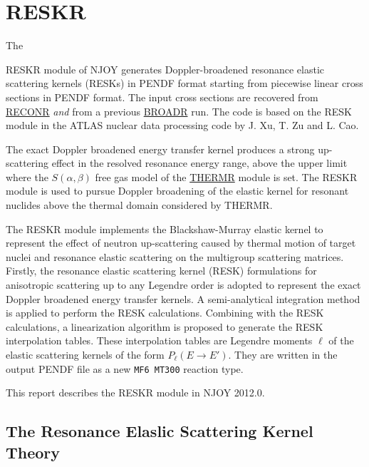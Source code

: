 \section{RESKR}
\label{sRESKR}

\hypertarget{sRESKRhy}{The}
RESKR module of NJOY generates
Doppler-broadened resonance elastic scattering
kernels (RESKs) in PENDF format starting from piecewise linear
cross sections in PENDF format.  The input cross sections are recovered from
\hyperlink{sRECONRhy}{RECONR} {\sl and} from a previous
\hyperlink{sBROADRhy}{BROADR} run. The code is based on
the RESK\cite{RESK} module in the ATLAS nuclear data processing
code\cite{ATLAS} by J. Xu, T. Zu and L. Cao.

The exact Doppler broadened energy transfer kernel produces a strong
up-scattering effect in the resolved resonance energy range, above the
upper limit where the $S(\alpha,\beta)$ free gas model of the
\hyperlink{sTHERMRhy}{THERMR} module is set. The RESKR module
is used to pursue Doppler broadening of the elastic kernel for resonant
nuclides above the thermal domain considered by THERMR.

The RESKR module implements the Blackshaw-Murray\cite{BLACKSHAW} elastic
kernel to represent the effect of neutron up-scattering caused by thermal
motion of target nuclei and resonance elastic scattering on the multigroup
scattering matrices. Firstly, the resonance elastic scattering kernel (RESK)
formulations for anisotropic scattering up to any Legendre order is adopted
to represent the exact Doppler broadened energy transfer kernels. A
semi-analytical integration method is applied to perform the RESK
calculations. Combining with the RESK calculations, a linearization
algorithm is proposed to generate the RESK interpolation tables. These
interpolation tables are Legendre moments $\ell$ of the elastic scattering
kernels of the form $P_\ell(E \rightarrow E')$. They are written in the
output PENDF file as a new {\tt MF6 MT300} reaction type.

This report describes the RESKR module in NJOY 2012.0.

\subsection{The Resonance Elaslic Scattering Kernel Theory}
\label{ssRESKR_theory}

